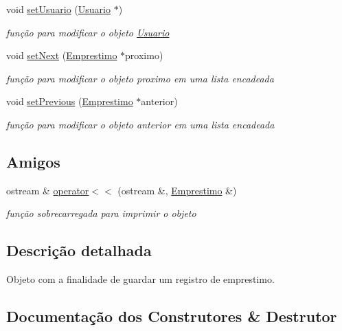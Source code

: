 \begin{DoxyCompactItemize}
void \hyperlink{class_emprestimo_a73fd99ddedbc367d50bd6266227aa0c1}{set\+Usuario} (\hyperlink{class_usuario}{Usuario} $\ast$)
\begin{DoxyCompactList}\small\item\em função para modificar o objeto \hyperlink{class_usuario}{Usuario} \end{DoxyCompactList}\item 
void \hyperlink{class_emprestimo_a25153a3857d3f1acdc93ae4a7e1d088f}{set\+Next} (\hyperlink{class_emprestimo}{Emprestimo} $\ast$proximo)
\begin{DoxyCompactList}\small\item\em função para modificar o objeto proximo em uma lista encadeada \end{DoxyCompactList}\item 
void \hyperlink{class_emprestimo_adba8bb7ad5ab611484ca09dcdc914d7d}{set\+Previous} (\hyperlink{class_emprestimo}{Emprestimo} $\ast$anterior)
\begin{DoxyCompactList}\small\item\em função para modificar o objeto anterior em uma lista encadeada \end{DoxyCompactList}\end{DoxyCompactItemize}
\subsection*{Amigos}
\begin{DoxyCompactItemize}
\item 
ostream \& \hyperlink{class_emprestimo_ada62ac295c20ff48788976bdc6d041e5}{operator$<$$<$} (ostream \&, \hyperlink{class_emprestimo}{Emprestimo} \&)
\begin{DoxyCompactList}\small\item\em função sobrecarregada para imprimir o objeto \end{DoxyCompactList}\end{DoxyCompactItemize}


\subsection{Descrição detalhada}
Objeto com a finalidade de guardar um registro de emprestimo. 

\subsection{Documentação dos Construtores \& Destrutor}
